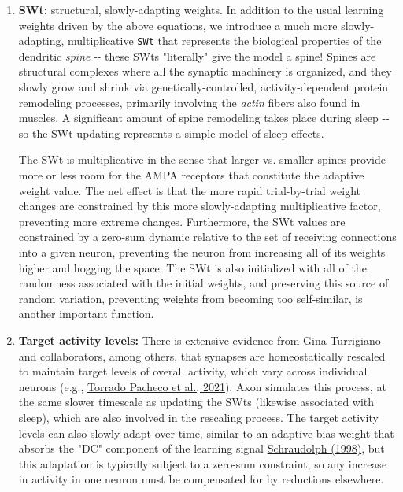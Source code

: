 \documentclass[11pt,twoside]{article}
\newif\myifpdf
\begin{document}
\begin{enumerate}
\def\labelenumi{\arabic{enumi}.}
\item \textbf{SWt:} structural, slowly-adapting weights. In addition to the usual learning weights driven by the above equations, we introduce a much more slowly-adapting, multiplicative \texttt{SWt} that represents the biological properties of the dendritic \emph{spine} -\/- these SWts "literally" give the model a spine! Spines are structural complexes where all the synaptic machinery is organized, and they slowly grow and shrink via genetically-controlled, activity-dependent protein remodeling processes, primarily involving the \emph{actin} fibers also found in muscles. A significant amount of spine remodeling takes place during sleep -\/- so the SWt updating represents a simple model of sleep effects.

The SWt is multiplicative in the sense that larger vs. smaller spines provide more or less room for the AMPA receptors that constitute the adaptive weight value. The net effect is that the more rapid trial-by-trial weight changes are constrained by this more slowly-adapting multiplicative factor, preventing more extreme changes. Furthermore, the SWt values are constrained by a zero-sum dynamic relative to the set of receiving connections into a given neuron, preventing the neuron from increasing all of its weights higher and hogging the space. The SWt is also initialized with all of the randomness associated with the initial weights, and preserving this source of random variation, preventing weights from becoming too self-similar, is another important function.

\item \textbf{Target activity levels:} There is extensive evidence from Gina Turrigiano and collaborators, among others, that synapses are homeostatically rescaled to maintain target levels of overall activity, which vary across individual neurons (e.g., \protect\hyperlink{references}{Torrado Pacheco et al., 2021}). Axon simulates this process, at the same slower timescale as updating the SWts (likewise associated with sleep), which are also involved in the rescaling process. The target activity levels can also slowly adapt over time, similar to an adaptive bias weight that absorbs the "DC" component of the learning signal \protect\hyperlink{references}{Schraudolph (1998)}, but this adaptation is typically subject to a zero-sum constraint, so any increase in activity in one neuron must be compensated for by reductions elsewhere.


\end{enumerate}
\end{document}
